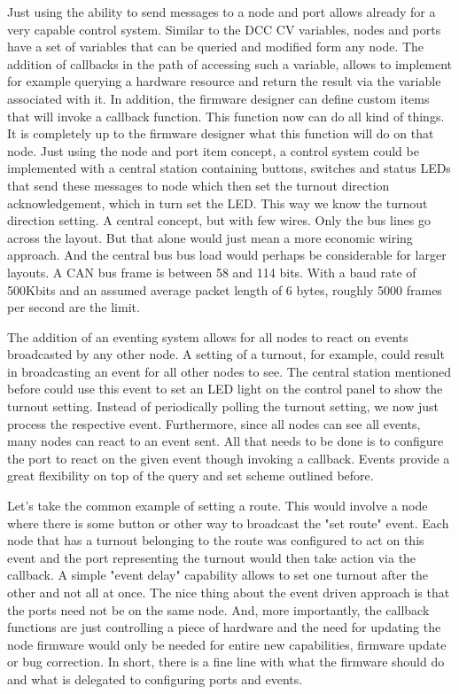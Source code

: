 Just using the ability to send messages to a node and port allows already for a very capable control system. Similar to the DCC CV variables, nodes and ports have a set of variables that can be queried and modified form any node. The addition of callbacks in the path of accessing such a variable, allows to implement for example querying a hardware resource and return the result via the variable associated with it. In addition, the firmware designer can define custom items that will invoke a callback function. This function now can do all kind of things. It is completely up to the firmware designer what this function will do on that node. Just using the node and port item concept, a control system could be implemented with a central station containing buttons, switches and status LEDs that send these messages to node which then set the turnout direction acknowledgement, which in turn set the LED. This way we know the turnout direction setting. A central concept, but with few wires. Only the bus lines go across the layout. But that alone would just mean a more economic wiring approach. And the central bus bus load would perhaps be considerable for larger layouts. A CAN bus frame is between 58 and 114 bits. With a baud rate of 500Kbits and an assumed average packet length of 6 bytes, roughly 5000 frames per second are the limit.

The addition of an eventing system allows for all nodes to react on events broadcasted by any other node. A setting of a turnout, for example, could result in broadcasting an event for all other nodes to see. The central station mentioned before could use this event to set an LED light on the control panel to show the turnout setting. Instead of periodically polling the turnout setting, we now just process the respective event. Furthermore, since all nodes can see all events, many nodes can react to an event sent. All that needs to be done is to configure the port to react on the given event though invoking a callback. Events provide a great flexibility on top of the query and set scheme outlined before.

Let's take the common example of setting a route. This would involve a node where there is some button or other way to broadcast the "set route" event. Each node that has a turnout belonging to the route was configured to act on this event and the port representing the turnout would then take action via the callback. A simple "event delay" capability allows to set one turnout after the other and not all at once. The nice thing about the event driven approach is that the ports need not be on the same node. And, more importantly, the callback functions are just controlling a piece of hardware and the need for updating the node firmware would only be needed for entire new capabilities, firmware update or bug correction. In short, there is a fine line with what the firmware should do and what is delegated to configuring ports and events.

